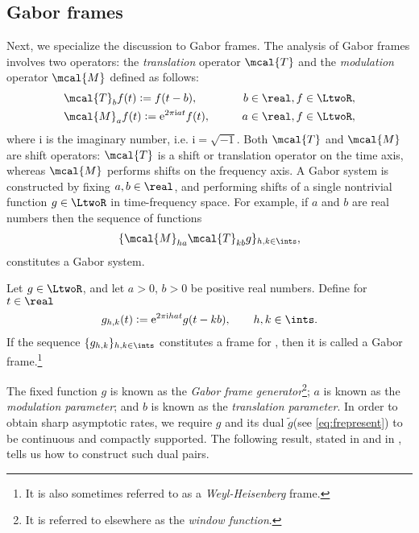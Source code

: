 \documentclass[a4paper, 12pt]{article}
\renewcommand{\i}{\mathrm{i}}
\newcommand{\tg}{\ensuremath{\tilde{g}}\xspace}
\begin{document}
\subsection{ Gabor frames}
Next, we specialize the discussion to Gabor frames. The analysis of Gabor frames involves two operators: the \emph{translation} operator  $\mcal{T}$ and  the \emph{modulation} operator $\mcal{M}$ defined as follows: 
\begin{align}
  & \mcal{T}_bf(t) := f(t -  b), &\qquad b \in \real, f \in \LtwoR, \label{eq:translation}\\
  & \mcal{M}_af(t) := \mathrm{e}^{2\pi \i at}f(t), &\qquad a \in \real, f \in \LtwoR,\label{eq:modulation} 
\end{align}
where $\i$ is the imaginary number, i.e.  $\i = \sqrt{-1}$.  Both $\mcal{T}$ and $\mcal{M}$ are shift operators: $\mcal{T}$ is a shift or translation operator on the time axis, whereas $\mcal{M}$ performs shifts on the frequency axis. A Gabor system is constructed by fixing $a, b \in \real$, and  performing shifts of a single nontrivial  function $g \in \LtwoR$  in time-frequency space. For example,  if $a$ and $b$ are real numbers then the sequence of functions  
\begin{align}
  \{\mcal{M}_{ha} \mcal{T}_{kb} g\}_{h,k \in \ints},\notag
  \label{}
\end{align}
constitutes  a Gabor system. 
\begin{defn}\label{defn:def}
  Let $g \in \LtwoR$, and let  $a > 0$, $b > 0$ be  positive real numbers. Define for $t \in \real$    
\begin{align}
  g_{h,k}(t) := \mathrm{e}^{2 \pi \i h a t }g(t - k b), \qquad   h,k \in \ints. \notag    
 \end{align}
 If the sequence $\{g_{h,k}\}_{h,k \in \ints}$ constitutes a  frame for \LtwoR, then it is called a Gabor frame.\footnote{It is also sometimes referred to as a \emph{Weyl-Heisenberg} frame.} 
\end{defn}
\noindent The fixed function $g$ is known as  the \emph{Gabor frame generator}\footnote{It is  referred to elsewhere as the \emph{window function}.}; $a$ is known as the \emph{modulation parameter}; and $b$ is known as the \emph{translation parameter}.   
In order to obtain sharp asymptotic rates, we require $g$ and its dual \tg (see \eqref{eq:frepresent}) to be continuous and compactly supported. The following result, stated  in  \citet[Lemma 1.2]{Christensen2006} and in  \citet[Proposition 2.4]{Zhang2008}, tells us how to construct such dual pairs.
\end{document}
